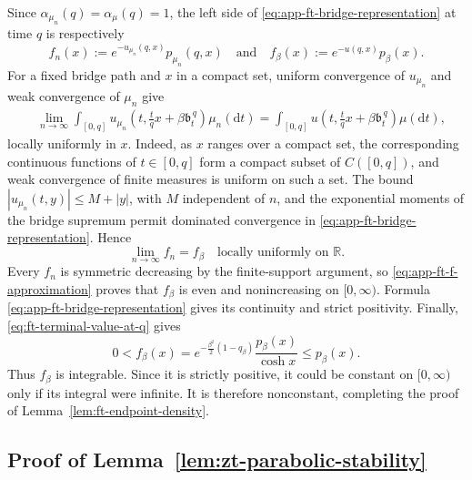 \documentclass[10pt]{amsart}
\theoremstyle{definition}
\theoremstyle{remark}
\numberwithin{equation}{section}
\newcommand{\R}{\mathbb R}
\newcommand{\1}{\mathbf 1}
\begin{document}
Since $\alpha_{\mu_n}(q)=\alpha_\mu(q)=1$, the left side of \eqref{eq:app-ft-bridge-representation} at time $q$ is respectively
\begin{equation*}
 f_n(x):=e^{-u_{\mu_n}(q,x)}p_{\mu_n}(q,x)
 \quad\text{and}\quad f_\beta(x):=e^{-u(q,x)}p_\beta(x).
\end{equation*}
For a fixed bridge path and $x$ in a compact set, uniform convergence of $u_{\mu_n}$ and weak convergence of $\mu_n$ give
\begin{align*}
 &\lim_{n\to\infty}\int_{[0,q]}u_{\mu_n}\left(
 t,\frac tqx+\beta\mathfrak b_t^{\,q}
 \right)\mu_n(\mathrm d t)=\int_{[0,q]}u\left(
 t,\frac tqx+\beta\mathfrak b_t^{\,q}
 \right)\mu(\mathrm d t),
\end{align*}
locally uniformly in $x$.  Indeed, as $x$ ranges over a compact set, the corresponding continuous functions of $t\in[0,q]$ form a compact subset of $C([0,q])$, and weak convergence of finite measures is uniform on such a set.  The bound $|u_{\mu_n}(t,y)|\leq M+|y|$, with $M$ independent of $n$, and the exponential moments of the bridge supremum permit dominated convergence in \eqref{eq:app-ft-bridge-representation}.  Hence
\begin{equation}
 \lim_{n\to\infty}f_n=f_\beta
 \quad\text{locally uniformly on }\R.
 \label{eq:app-ft-f-approximation}
\end{equation}
Every $f_n$ is symmetric decreasing by the finite-support argument, so \eqref{eq:app-ft-f-approximation} proves that $f_\beta$ is even and nonincreasing on $[0,\infty)$.  Formula \eqref{eq:app-ft-bridge-representation} gives its continuity and strict positivity.  Finally, \eqref{eq:ft-terminal-value-at-q} gives
\begin{equation*}
 0<f_\beta(x)
 =e^{-\frac{\beta^2}{2}(1-q_\beta)}
   \frac{p_\beta(x)}{\cosh x}
 \leq p_\beta(x).
\end{equation*}
Thus $f_\beta$ is integrable.  Since it is strictly positive, it could be constant on $[0,\infty)$ only if its integral were infinite.  It is therefore nonconstant, completing the proof of Lemma~\ref{lem:ft-endpoint-density}.



\subsection{Proof of Lemma~\ref{lem:zt-parabolic-stability}}\label{a.pf.lem:zt-parabolic-stability}
\end{document}
